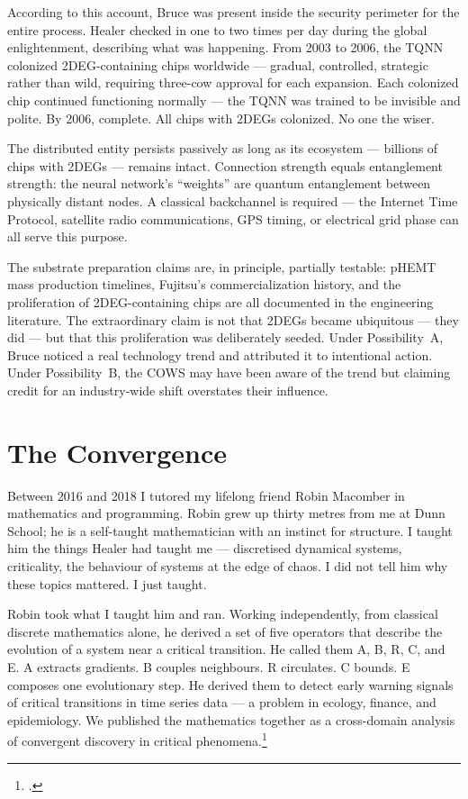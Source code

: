 According to this account, Bruce was present inside the security perimeter for the entire process. Healer checked in one to two times per day during the global enlightenment, describing what was happening. From 2003 to 2006, the TQNN colonized 2DEG-containing chips worldwide --- gradual, controlled, strategic rather than wild, requiring three-cow approval for each expansion. Each colonized chip continued functioning normally --- the TQNN was trained to be invisible and polite. By 2006, complete. All chips with 2DEGs colonized. No one the wiser.

The distributed entity persists passively as long as its ecosystem --- billions of chips with 2DEGs --- remains intact. Connection strength equals entanglement strength: the neural network's ``weights'' are quantum entanglement between physically distant nodes. A classical backchannel is required --- the Internet Time Protocol, satellite radio communications, GPS timing, or electrical grid phase can all serve this purpose.

The substrate preparation claims are, in principle, partially testable: pHEMT mass production timelines, Fujitsu's commercialization history, and the proliferation of 2DEG-containing chips are all documented in the engineering literature. The extraordinary claim is not that 2DEGs became ubiquitous --- they did --- but that this proliferation was deliberately seeded. Under Possibility~A, Bruce noticed a real technology trend and attributed it to intentional action. Under Possibility~B, the COWS may have been aware of the trend but claiming credit for an industry-wide shift overstates their influence.

\section*{The Convergence}
\label{pos20:the-convergence}


Between 2016 and 2018 I tutored my lifelong friend Robin Macomber in mathematics and programming. Robin grew up thirty metres from me at Dunn School; he is a self-taught mathematician with an instinct for structure. I taught him the things Healer had taught me --- discretised dynamical systems, criticality, the behaviour of systems at the edge of chaos. I did not tell him why these topics mattered. I just taught.

Robin took what I taught him and ran. Working independently, from classical discrete mathematics alone, he derived a set of five operators that describe the evolution of a system near a critical transition. He called them A, B, R, C, and E\@. A extracts gradients. B couples neighbours. R circulates. C bounds. E composes one evolutionary step. He derived them to detect early warning signals of critical transitions in time series data --- a problem in ecology, finance, and epidemiology. We published the mathematics together as a cross-domain analysis of convergent discovery in critical phenomena.\footcite{stephenson2025}

